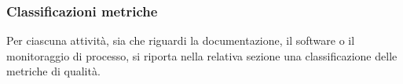 



	\subsubsection{Classificazioni metriche} %

	Per ciascuna attività, sia che riguardi la documentazione, il software o il monitoraggio di processo, si riporta nella relativa sezione una classificazione delle metriche di qualità.


